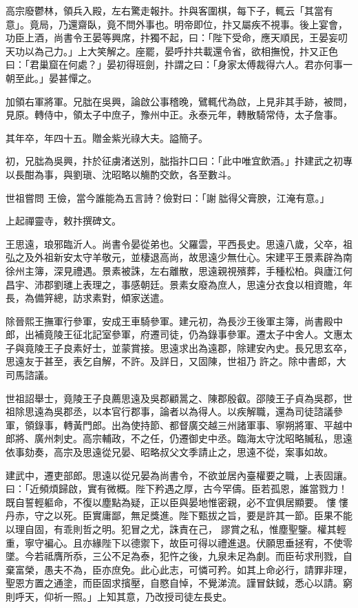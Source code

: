 \begin{pinyinscope}
 高宗廢鬱林，領兵入殿，左右驚走報抃。抃與客圍棋，每下子，輒云「其當有意」。竟局，乃還齋臥，竟不問外事也。明帝即位，抃又屬疾不視事。後上宴會，功臣上酒，尚書令王晏等興席，抃獨不起，曰：「陛下受命，應天順民，王晏妄叨天功以為己力。」上大笑解之。座罷，晏呼抃共載還令省，欲相撫悅，抃又正色曰：「君巢窟在何處？」晏初得班劍，抃謂之曰：「身家太傅裁得六人。君亦何事一朝至此。」晏甚憚之。



 加領右軍將軍。兄朏在吳興，論啟公事稽晚，鷿輒代為啟，上見非其手跡，被問，見原。轉侍中，領太子中庶子，豫州中正。永泰元年，轉散騎常侍，太子詹事。



 其年卒，年四十五。贈金紫光祿大夫。謚簡子。



 初，兄朏為吳興，抃於征虜渚送別，朏指抃口曰：「此中唯宜飲酒。」抃建武之初專以長酣為事，與劉瑱、沈昭略以觴酌交飲，各至數斗。



 世祖嘗問
 王儉，當今誰能為五言詩？儉對曰：「謝朏得父膏腴，江淹有意。」



 上起禪靈寺，敕抃撰碑文。



 王思遠，琅邪臨沂人。尚書令晏從弟也。父羅雲，平西長史。思遠八歲，父卒，祖弘之及外祖新安太守羊敬元，並棲退高尚，故思遠少無仕心。宋建平王景素辟為南徐州主簿，深見禮遇。景素被誅，左右離散，思遠親視殯葬，手種松柏。與廬江何昌宇、沛郡劉璡上表理之，事感朝廷。景素女廢為庶人，思遠分衣食以相資贍，年長，為備笄總，訪求素對，傾家送遣。



 除晉熙王撫軍行參軍，安成王車騎參軍。建元初，為長沙王後軍主簿，尚書殿中郎，出補竟陵王征北記室參軍，府遷司徒，仍為錄事參軍。遷太子中舍人。文惠太子與竟陵王子良素好士，並蒙賞接。思遠求出為遠郡，除建安內史。長兄思玄卒，思遠友于甚至，表乞自解，不許。及詳日，又固陳，世祖乃
 許之。除中書郎，大司馬諮議。



 世祖詔舉士，竟陵王子良薦思遠及吳郡顧暠之、陳郡殷叡。邵陵王子貞為吳郡，世祖除思遠為吳郡丞，以本官行郡事，論者以為得人。以疾解職，還為司徒諮議參軍，領錄事，轉黃門郎。出為使持節、都督廣交越三州諸軍事、寧朔將軍、平越中郎將、廣州刺史。高宗輔政，不之任，仍遷御史中丞。臨海太守沈昭略贓私，思遠依事劾奏，高宗及思遠從兄晏、昭略叔父文季請止之，思遠不從，案事如故。



 建武中，遷吏部郎。思遠以從兄晏為尚書令，不欲並居內臺權要之職，上表固讓。曰：「近頻煩歸啟，實有微概。陛下矜遇之厚，古今罕儔。臣若孤恩，誰當戮力！既自誓輕軀命，不復以塵點為疑，正以臣與晏地惟密親，必不宜俱居顯要。慺慺丹赤，守之以死。臣實庸鄙，無足獎進。陛下甄拔之旨，要是許其一節。臣果不能以理自固，有乖則哲之明。犯冒之尤，誅責在己，
 謬賞之私，惟塵聖鑒。權其輕重，寧守褊心。且亦緣陛下以德禦下，故臣可得以禮進退。伏願思垂拯宥，不使零墜。今若祗膺所忝，三公不足為泰，犯忤之後，九泉未足為劇。而臣茍求刑戮，自棄富榮，愚夫不為，臣亦庶免。此心此志，可憐可矜。如其上命必行，請罪非理，聖恩方置之通塗，而臣固求擯壓，自愍自悼，不覺涕流。謹冒鈇鉞，悉心以請。窮則呼天，仰祈一照。」上知其意，乃改授司徒左長史。




\end{pinyinscope}
